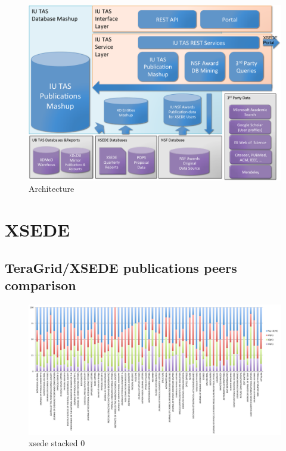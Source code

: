 \documentclass{sig-alternate}
\begin{document}
\begin{figure}[htb] 
  \centering 
    \includegraphics[width=1.0\columnwidth]{images-new/architecture.pdf} 
  \caption{Architecture}\label{F:architecture} 
\end{figure} 


\section{XSEDE}

\subsection{TeraGrid/XSEDE\cite{www-xsede} publications peers comparison}

\begin{figure}[htb] 
  \centering 
    \includegraphics[width=1.0\textwidth]{images-new/xsede-journal-stacked.pdf} 
  \caption{xsede stacked 0}\label{F:xsede-stacked} 
\end{figure}
\end{document}
